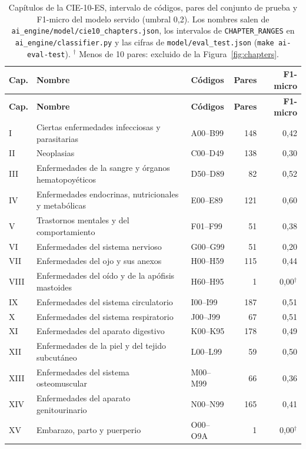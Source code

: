 {\small
\begin{longtable}{lP{6.6cm}lrr}
\caption{Capítulos de la CIE-10-ES, intervalo de códigos, pares del conjunto de prueba y F1-micro del modelo servido (umbral 0,2). Los nombres salen de \texttt{ai\_engine/\allowbreak model/\allowbreak cie10\_chapters.json}, los intervalos de \texttt{CHAPTER\_RANGES} en \texttt{ai\_engine/\allowbreak classifier.py} y las cifras de \texttt{model/\allowbreak eval\_test.json} (\texttt{make ai-eval-test}). $^{\dagger}$ Menos de 10 pares: excluido de la Figura~\ref{fig:chapters}.}\label{tab:capitulos-cie10}\\
\hline
\textbf{Cap.} & \textbf{Nombre} & \textbf{Códigos} & \textbf{Pares} & \textbf{F1-micro} \\
\hline
\endfirsthead
\hline
\textbf{Cap.} & \textbf{Nombre} & \textbf{Códigos} & \textbf{Pares} & \textbf{F1-micro} \\
\hline
\endhead
I & Ciertas enfermedades infecciosas y parasitarias & A00--B99 & 148 & 0,42 \\
II & Neoplasias & C00--D49 & 138 & 0,30 \\
III & Enfermedades de la sangre y órganos hematopoyéticos & D50--D89 & 82 & 0,52 \\
IV & Enfermedades endocrinas, nutricionales y metabólicas & E00--E89 & 121 & 0,60 \\
V & Trastornos mentales y del comportamiento & F01--F99 & 51 & 0,38 \\
VI & Enfermedades del sistema nervioso & G00--G99 & 51 & 0,20 \\
VII & Enfermedades del ojo y sus anexos & H00--H59 & 115 & 0,44 \\
VIII & Enfermedades del oído y de la apófisis mastoides & H60--H95 & 1 & 0,00$^{\dagger}$ \\
IX & Enfermedades del sistema circulatorio & I00--I99 & 187 & 0,51 \\
X & Enfermedades del sistema respiratorio & J00--J99 & 67 & 0,51 \\
XI & Enfermedades del aparato digestivo & K00--K95 & 178 & 0,49 \\
XII & Enfermedades de la piel y del tejido subcutáneo & L00--L99 & 59 & 0,50 \\
XIII & Enfermedades del sistema osteomuscular & M00--M99 & 66 & 0,36 \\
XIV & Enfermedades del aparato genitourinario & N00--N99 & 165 & 0,41 \\
XV & Embarazo, parto y puerperio & O00--O9A & 1 & 0,00$^{\dagger}$ \\

\end{longtable}}
